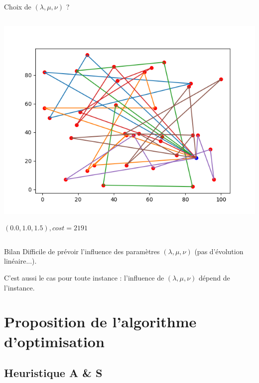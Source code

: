 \documentclass{beamer}
\begin{document}
\begin{frame}{Choix de $(\lambda,\mu,\nu)$ ?}
\begin{columns}[t]
 
  \begin{column}{4cm}
  	\centering
	\includegraphics[scale=0.27]{resCW001015.png}
	
 	$(0.0,1.0,1.5), cost = 2191$

  \end{column}
 \end{columns}
 
\begin{alertblock}{Bilan}
Difficile de prévoir l'influence des paramètres $(\lambda,\mu,\nu)$ (pas d'évolution linéaire...). 

C'est aussi le cas pour toute instance : l'influence de $(\lambda,\mu,\nu)$ dépend de l'instance.
\end{alertblock}

\end{frame}

\section{Proposition de l'algorithme d'optimisation}

\subsection{Heuristique A \& S}
\end{document}
